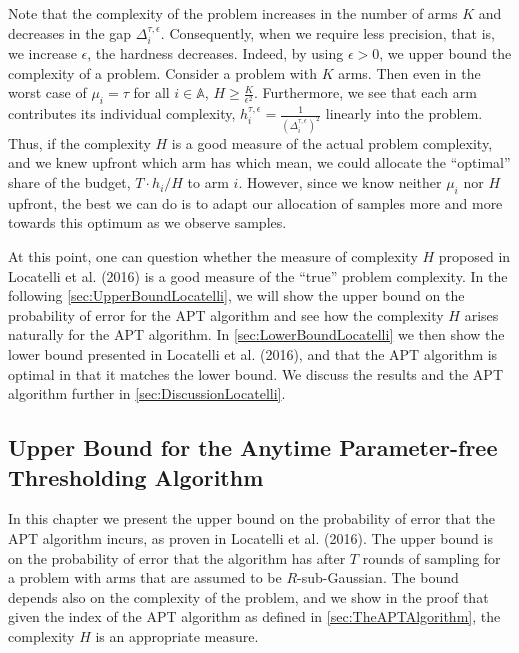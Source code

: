 \documentclass[11pt,]{article}
\begin{document}
Note that the complexity of the problem increases in the number of arms
\(K\) and decreases in the gap \(\Delta_i^{\tau,\epsilon}\).
Consequently, when we require less precision, that is, we increase
\(\epsilon\), the hardness decreases. Indeed, by using \(\epsilon > 0\),
we upper bound the complexity of a problem. Consider a problem with
\(K\) arms. Then even in the worst case of \(\mu_i = \tau\) for all
\(i \in \mathbb{A}\), \(H \geq \frac{K}{\epsilon^2}\). Furthermore, we
see that each arm contributes its individual complexity,
\(h_i^{\tau,\epsilon} = \frac{1}{(\Delta_i^{\tau,\epsilon})^2}\)
linearly into the problem. Thus, if the complexity \(H\) is a good
measure of the actual problem complexity, and we knew upfront which arm
has which mean, we could allocate the ``optimal'' share of the budget,
\(T \cdot h_i /H\) to arm \(i\). However, since we know neither
\(\mu_i\) nor \(H\) upfront, the best we can do is to adapt our
allocation of samples more and more towards this optimum as we observe
samples.

At this point, one can question whether the measure of complexity \(H\)
proposed in Locatelli et al. (2016) is a good measure of the ``true''
problem complexity. In the following \autoref{sec:UpperBoundLocatelli},
we will show the upper bound on the probability of error for the APT
algorithm and see how the complexity \(H\) arises naturally for the APT
algorithm. In \autoref{sec:LowerBoundLocatelli} we then show the lower
bound presented in Locatelli et al. (2016), and that the APT algorithm
is optimal in that it matches the lower bound. We discuss the results
and the APT algorithm further in \autoref{sec:DiscussionLocatelli}.

\subsection{\texorpdfstring{Upper Bound for the Anytime Parameter-free
Thresholding Algorithm
\label{sec:UpperBoundLocatelli}}{Upper Bound for the Anytime Parameter-free Thresholding Algorithm }}\label{upper-bound-for-the-anytime-parameter-free-thresholding-algorithm}

In this chapter we present the upper bound on the probability of error
that the APT algorithm incurs, as proven in Locatelli et al. (2016). The
upper bound is on the probability of error that the algorithm has after
\(T\) rounds of sampling for a problem with arms that are assumed to be
\(R\)-sub-Gaussian. The bound depends also on the complexity of the
problem, and we show in the proof that given the index of the APT
algorithm as defined in \autoref{sec:TheAPTAlgorithm}, the complexity
\(H\) is an appropriate measure.
\end{document}
